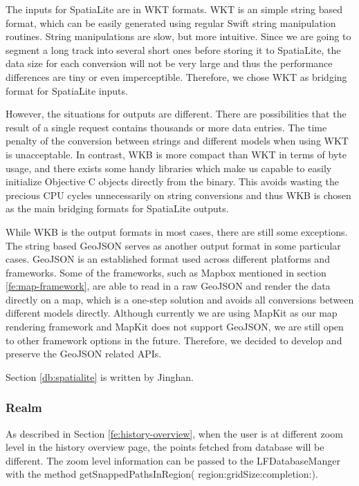 \documentclass[12pt,a4paper]{article}
\renewcommand\texttt[1]{{\ttfamily\color{textttColor}#1}}
\begin{document}
                The inputs for SpatiaLite are in WKT formats. WKT is an simple string based format, which can be easily generated using regular Swift string manipulation routines. String manipulations are slow, but more intuitive. Since we are going to segment a long track into several short ones before storing it to SpatiaLite, the data size for each conversion will not be very large and thus the performance differences are tiny or even imperceptible. Therefore, we chose WKT as bridging format for SpatiaLite inputs.
                
                However, the situations for outputs are different. There are possibilities that the result of a single request contains thousands or more data entries. The time penalty of the conversion between strings and different models when using WKT is unacceptable. In contrast, WKB is more compact than WKT in terms of byte usage, and there exists some handy libraries which make us capable to easily initialize Objective C objects directly from the binary. This avoids wasting the precious CPU cycles unnecessarily on string conversions and thus WKB is chosen as the main bridging formats for SpatiaLite outputs.
                
                While WKB is the output formats in most cases, there are still some exceptions. The string based GeoJSON serves as another output format in some particular cases. GeoJSON is an established format used across different platforms and frameworks. Some of the frameworks, such as Mapbox mentioned in section \ref{fe:map-framework}, are able to read in a raw GeoJSON and render the data directly on a map, which is a one-step solution and avoids all conversions between different models directly. Although currently we are using MapKit as our map rendering framework and MapKit does not support GeoJSON, we are still open to other framework options in the future. Therefore, we decided to develop and preserve the GeoJSON related APIs.
                
                \footnotesize
                Section \ref{db:spatialite} is written by Jinghan.
                \normalsize
                
            \subsubsection{Realm} %
                \label{db:realm}
                
                As described in Section \ref{fe:history-overview}, when the user is at different zoom level in the history overview page, the points fetched from database will be different. The zoom level information can be passed to the \texttt{LFDatabaseManger} with the method \texttt{getSnappedPathsInRegion( region:gridSize:completion:)}.
                
\end{document}
